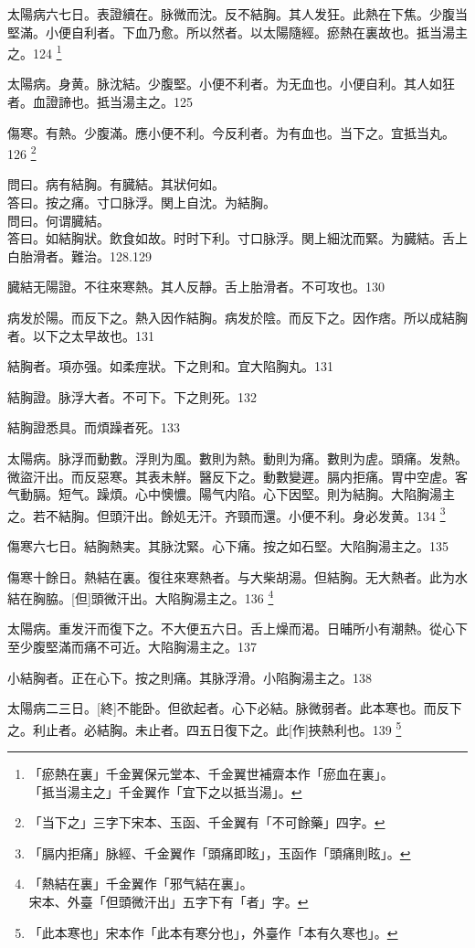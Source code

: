 \documentclass[12pt,twoside,UTF8,b5paper]{ctexbook}
\begin{document}
太陽病六七日。表證續在。脉微而沈。反不結胸。其人发狂。此熱在下焦。少腹当堅滿。小便自利者。下血乃愈。所以然者。以太陽隨經。瘀熱在裏故也。抵当湯主之。124
	\footnote{「瘀熱在裏」千金翼保元堂本、千金翼世補齋本作「瘀血在裏」。\\「抵当湯主之」千金翼作「宜下之以抵当湯」。}

太陽病。身黄。脉沈結。少腹堅。小便不利者。为无血也。小便自利。其人如狂者。血證諦也。抵当湯主之。125

傷寒。有熱。少腹滿。應小便不利。今反利者。为有血也。当下之。宜抵当丸。126
	\footnote{「当下之」三字下宋本、玉函、千金翼有「不可餘藥」四字。}

問曰。病有結胸。有臓結。其狀何如。\\
答曰。按之痛。寸口脉浮。関上自沈。为結胸。\\
問曰。何谓臓結。\\
答曰。如結胸狀。飲食如故。时时下利。寸口脉浮。関上細沈而緊。为臓結。舌上白胎滑者。難治。128.129

臓結无陽證。不往來寒熱。其人反靜。舌上胎滑者。不可攻也。130

病发於陽。而反下之。熱入因作結胸。病发於陰。而反下之。因作痞。所以成結胸者。以下之太早故也。131

結胸者。項亦强。如柔痙狀。下之則和。宜大陷胸丸。131

結胸證。脉浮大者。不可下。下之則死。132

結胸證悉具。而煩躁者死。133

太陽病。脉浮而動數。浮則为風。數則为熱。動則为痛。數則为虗。頭痛。发熱。微盜汗出。而反惡寒。其表未觧。醫反下之。動數變遲。膈内拒痛。胃中空虗。客气動膈。短气。躁煩。心中懊憹。陽气内陷。心下因堅。則为結胸。大陷胸湯主之。若不結胸。但頭汗出。餘処无汗。齐頸而還。小便不利。身必发黄。134
	\footnote{「膈内拒痛」脉經、千金翼作「頭痛即眩」，玉函作「頭痛則眩」。}

傷寒六七日。結胸熱実。其脉沈緊。心下痛。按之如石堅。大陷胸湯主之。135

傷寒十餘日。熱結在裏。復往來寒熱者。与大柴胡湯。但結胸。无大熱者。此为水結在胸脇。[但]頭微汗出。大陷胸湯主之。136
	\footnote{「熱結在裏」千金翼作「邪气結在裏」。\\宋本、外臺「但頭微汗出」五字下有「者」字。}

太陽病。重发汗而復下之。不大便五六日。舌上燥而渴。日晡所小有潮熱。從心下至少腹堅滿而痛不可近。大陷胸湯主之。137

小結胸者。正在心下。按之則痛。其脉浮滑。小陷胸湯主之。138

太陽病二三日。[終]不能卧。但欲起者。心下必結。脉微弱者。此本寒也。而反下之。利止者。必結胸。未止者。四五日復下之。此[作]挾熱利也。139
	\footnote{「此本寒也」宋本作「此本有寒分也」，外臺作「本有久寒也」。}
\end{document}
